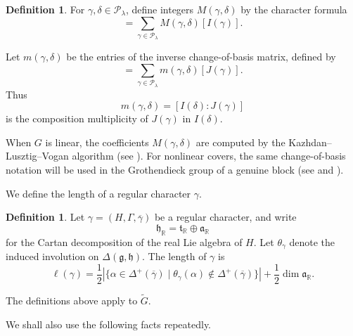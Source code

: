 \documentclass{amsart}
\newcommand{\bbR}{{\mathbb R}}
\newcommand{\fk}{\mathfrak}
\newcommand{\ovl}{\overline}
\theoremstyle{definition}
\newtheorem{definition}[thm]{Definition}
\newcommand{\tu}{\widetilde}
\begin{document}
\begin{definition}\label{KLVpoly}
For $\gamma,\delta\in\mathcal P_\lambda$, define integers
$M(\gamma,\delta)$ by the character formula
\begin{equation*}
[J(\delta)]
=
\sum_{\gamma\in\mathcal P_\lambda}
M(\gamma,\delta)[I(\gamma)].
\end{equation*}

Let $m(\gamma,\delta)$ be the entries of the inverse change-of-basis matrix,
defined by
\begin{equation*}
[I(\delta)]
=
\sum_{\gamma\in\mathcal P_\lambda}
m(\gamma,\delta)[J(\gamma)].
\end{equation*}
Thus
\begin{equation*}
m(\gamma,\delta)=[I(\delta):J(\gamma)]
\end{equation*}
is the composition multiplicity of $J(\gamma)$ in $I(\delta)$.

When $G$ is linear, the coefficients $M(\gamma,\delta)$ are computed by the
Kazhdan--Lusztig--Vogan algorithm (see \cite{V83a}). 
For nonlinear covers, the same change-of-basis notation will be used in the
Grothendieck group of a genuine block (see \cite{RT00} and \cite{RT05}).
\end{definition}





We define the length of a regular character $\gamma$.


\begin{definition}\label{d:length}
Let $\gamma=(H,\Gamma,\ovl\gamma)$ be a regular character, and write
\[
\fk h_{\bbR}=\fk t_{\bbR}\oplus \fk a_{\bbR}
\]
for the Cartan decomposition of the real Lie algebra of $H$. Let
$\theta_\gamma$ denote the induced involution on
$\Delta(\fk g,\fk h)$. The length of $\gamma$ is
\begin{equation*}
\ell(\gamma)
=
\frac{1}{2}
\left|
\{\alpha\in\Delta^+(\ovl\gamma)
\mid
\theta_\gamma(\alpha)\notin\Delta^+(\ovl\gamma)\}
\right|
+
\frac{1}{2}\dim\fk a_{\bbR}.
\end{equation*}
\end{definition}


The definitions  above apply to $\tu G$. 
\medskip

We shall also use the following facts repeatedly.
\end{document}
